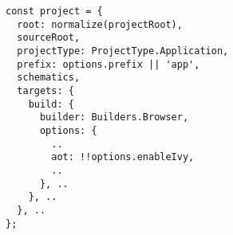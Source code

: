 \begin{verbatim}
const project = {
  root: normalize(projectRoot),
  sourceRoot,
  projectType: ProjectType.Application,
  prefix: options.prefix || 'app',
  schematics,
  targets: {
    build: {
      builder: Builders.Browser,
      options: {
        ..
        aot: !!options.enableIvy,
        ..
      }, ..
    }, ..
  }, ..
};
\end{verbatim}
